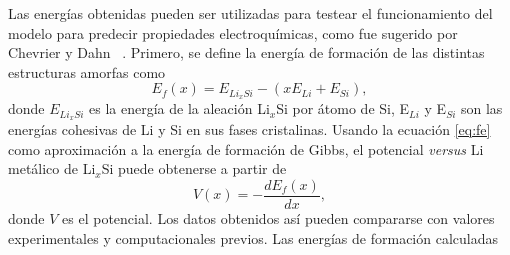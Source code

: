 \begin{table}[h]
    \centering
    \caption{Energías de formación obtenidas a través de la ecuación \ref{eq:fe}}
    \setlength\extrarowheight{2pt}
    \label{t:fe}
\end{table}
Las energías obtenidas pueden ser utilizadas para testear el funcionamiento del 
modelo para predecir propiedades electroquímicas, como fue sugerido por Chevrier
y Dahn ~\cite{chevrier2009}. Primero, se define la energía de formación de las 
distintas estructuras amorfas como
\begin{equation}\label{eq:fe}
    E_f(x) = E_{Li_xSi} - (x E_{Li} + E_{Si}),
\end{equation}
donde $E_{Li_xSi}$ es la energía de la aleación Li$_x$Si por átomo de Si, E$_{Li}$
y E$_{Si}$ son las energías cohesivas de Li y Si en sus fases cristalinas. Usando
la ecuación \ref{eq:fe} como aproximación a la energía de formación de Gibbs, el 
potencial \textit{versus} Li metálico de Li$_x$Si puede obtenerse a partir de
\begin{equation}\label{eq:voltaje}
    V(x) = - \frac{dE_f(x)}{dx},
\end{equation}
donde $V$ es el potencial. Los datos obtenidos así pueden compararse con valores
experimentales y computacionales previos. Las energías de formación calculadas
